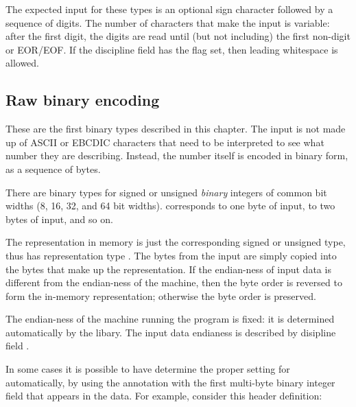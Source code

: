 \aedBegin{}
\aedEnd{}

The expected input for these types is an optional sign character
followed by a sequence of digits.  The number of characters that make
the input is variable: after the first digit, the digits are read
until (but not including) the first non-digit or EOR/EOF.
If the \pads{} discipline field
 has the  flag set, then
leading whitespace is allowed.

\subsection{Raw binary encoding}

\bBegin{}
\bEnd{}

These are the first binary types described in this chapter. The input
is not made up of ASCII or EBCDIC characters that need to be interpreted
to see what number they are describing.  Instead, the number itself is
encoded in binary form, as a sequence of bytes.  

There are binary types for signed or unsigned {\em binary\/} integers
of common bit widths (8, 16, 32, and 64 bit widths).   corresponds
to one byte of input,  to two bytes of input, and so on.

The representation in memory is just the corresponding signed or
unsigned type, thus  has representation type .  The bytes from
the input are simply copied into the bytes that make up the representation.  If
the endian-ness of input data is different from the endian-ness of the
machine, then the byte order is reversed to form the in-memory
representation; otherwise the byte order is preserved.

The endian-ness of the machine running the \pads{} program is fixed: it
is determined automatically by the \pads{} libary.  
The input data endianess is described by \pads{} disipline 
field . 

In some cases it is possible to have \pads{} determine the
proper setting for  automatically, by
using the annotation 
with the first multi-byte binary integer field that appears
in the data.  For example, consider this header definition:

